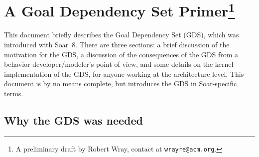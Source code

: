\chapter[A Goal Dependency Set Primer]{
A Goal Dependency Set Primer\footnote{A preliminary draft by Robert Wray, contact at \texttt{wrayre@acm.org}.
}}

\label{GDS}




%


      






This document briefly describes the Goal Dependency Set (GDS), which
was introduced with Soar~8.  There are three sections: a brief
discussion of the motivation for the GDS, a discussion of the
consequences of the GDS from a behavior developer/modeler's point of
view, and some details on the kernel implementation of the GDS, for
anyone working at the architecture level.  This document is by no
means complete, but introduces the GDS in Soar-specific terms.

\section*{Why the GDS was needed}

